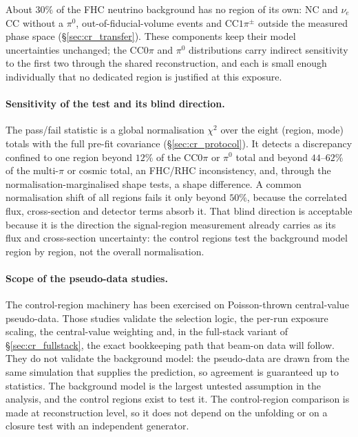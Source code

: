 \documentclass[11pt,a4paper]{article}
\begin{document}
About $30\%$ of the FHC neutrino background has no region of its own: NC and
$\nu_e$CC without a $\pi^0$, out-of-fiducial-volume events and CC$1\pi^\pm$ outside the
measured phase space (\S\ref{sec:cr_transfer}). These components keep their model
uncertainties unchanged; the CC$0\pi$ and $\pi^0$ distributions carry indirect
sensitivity to the first two through the shared reconstruction, and each is small
enough individually that no dedicated region is justified at this exposure.

\paragraph{Sensitivity of the test and its blind direction.} The pass/fail statistic is
a global normalisation $\chi^2$ over the eight (region, mode) totals with the full
pre-fit covariance (\S\ref{sec:cr_protocol}). It detects a discrepancy confined to one
region beyond $12\%$ of the CC$0\pi$ or $\pi^0$ total and beyond $44$--$62\%$ of the
multi-$\pi$ or cosmic total, an FHC/RHC inconsistency, and, through the
normalisation-marginalised shape tests, a shape difference. A common
normalisation shift of all regions fails it only beyond $50\%$, because the correlated
flux, cross-section and detector terms absorb it. That blind direction is acceptable
because it is the direction the signal-region measurement already carries as its flux
and cross-section uncertainty: the control regions test the background model region by
region, not the overall normalisation.

\paragraph{Scope of the pseudo-data studies.}
The control-region machinery has been exercised on Poisson-thrown central-value pseudo-data.
Those studies validate the selection logic, the per-run exposure scaling, the
central-value weighting and, in the full-stack variant of \S\ref{sec:cr_fullstack}, the
exact bookkeeping path that beam-on data will follow. They do not validate the
background model: the pseudo-data are drawn from the same simulation that supplies the
prediction, so agreement is guaranteed up to statistics. The background model is the
largest untested assumption in the analysis, and the control regions exist to test it. The
control-region comparison is made at reconstruction level, so it does not depend on the unfolding or
on a closure test with an independent generator.
\end{document}

